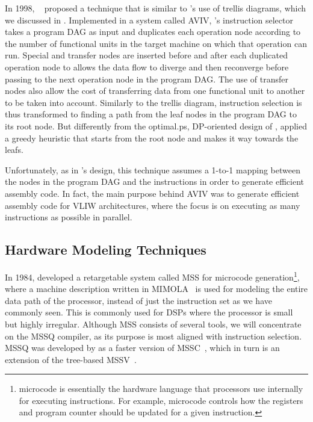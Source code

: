 In 1998, \citeauthor{Hanono1998}~\cite{Hanono1998, Hanono1999} proposed a
technique that is similar to \citeauthor{Wess1992}'s use of \glspl{trellis
  diagram}, which we discussed in .
%
Implemented in a
system called \gls{AVIV}, \citeauthor{Hanono1998}'s \gls{instruction selector}
takes a \gls{program DAG} as input and duplicates each operation \gls{node}
according to the number of functional units in the \gls{target machine} on which
that operation can run.
%
Special  and
\glspl{transfer node} are inserted before and after each duplicated operation
\gls{node} to allows the data flow to diverge and then reconverge before passing
to the next operation \gls{node} in the \gls{program DAG}.
%
The use of
\glspl{transfer node} also allow the cost of transferring data from one
functional unit to another to be taken into account.
%
Similarly to the
\gls{trellis diagram}, \gls{instruction selection} is thus transformed to
finding a path from the \gls{leaf} \glspl{node} in the \gls{program DAG} to its
\gls{root} \gls{node}.
%
But differently from the \gls{optimal.ps},
\mbox{\gls{DP}-oriented} design of \citeauthor{Wess1992},
\citeauthor{Hanono1998} applied a greedy heuristic that starts from the
\gls{root} \gls{node} and makes it way towards the \glspl{leaf}.

Unfortunately, as in \citeauthor{Wess1992}'s design, this technique assumes a
\mbox{1-to-1} mapping between the \glspl{node} in the \gls{program DAG} and the
\glspl{instruction} in order to generate efficient \gls{assembly code}.
%
In fact,
the main purpose behind \gls{AVIV} was to generate efficient \gls{assembly code}
for \gls{VLIW} architectures, where the focus is on executing as many
\glspl{instruction} as possible in parallel.


\subsection{Hardware Modeling Techniques}

In 1984, \textcite{Marwedel1984} developed a retargetable system called
\gls{MSS} for \gls{microcode generation}\footnote{\Gls{microcode} is essentially
  the hardware language that processors use internally for executing
  \glspl{instruction}.
%
For example, \gls{microcode} controls how the
  \glspl{register} and program counter should be updated for a given
  \gls{instruction}.}, where a \gls{machine description} written in
\gls{MIMOLA}~\cite{Zimmermann1979} is used for modeling the entire data path of
the processor, instead of just the \gls{instruction set} as we have commonly
seen.
%
This is commonly used for \glspl{DSP} where the processor is small but
highly irregular.
%
Although \gls{MSS} consists of several tools, we will
concentrate on the \gls{MSSQ} \gls{compiler}, as its purpose is most aligned
with \gls{instruction selection}.
%
\gls{MSSQ} was developed by
\textcite{Leupers1998} as a faster version of \gls{MSSC}~\cite{Nowak1989}, which
in turn is an extension of the \gls{tree}-based \gls{MSSV}~\cite{Marwedel1993}.

